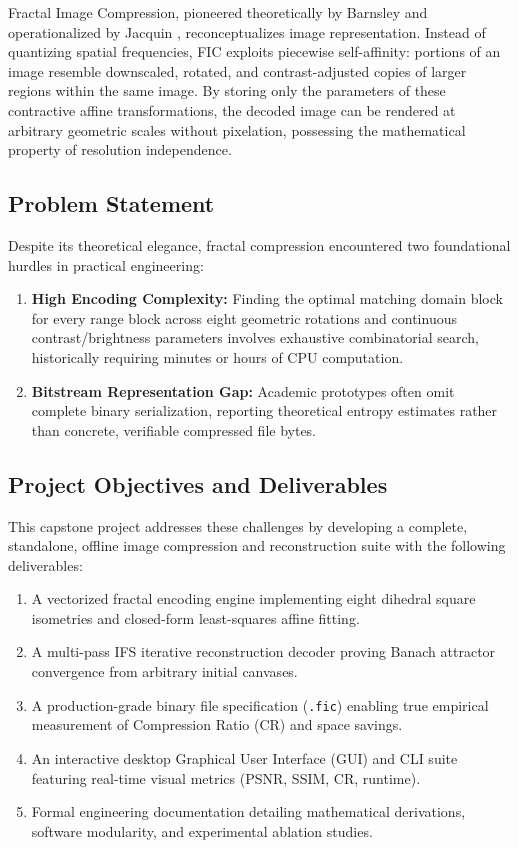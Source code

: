 \documentclass[11pt,a4paper]{article}
\begin{document}
Fractal Image Compression, pioneered theoretically by Barnsley \cite{barnsley1988fractals} and operationalized by Jacquin \cite{jacquin1992image}, reconceptualizes image representation. Instead of quantizing spatial frequencies, FIC exploits piecewise self-affinity: portions of an image resemble downscaled, rotated, and contrast-adjusted copies of larger regions within the same image. By storing only the parameters of these contractive affine transformations, the decoded image can be rendered at arbitrary geometric scales without pixelation, possessing the mathematical property of resolution independence.

\subsection{Problem Statement}
Despite its theoretical elegance, fractal compression encountered two foundational hurdles in practical engineering:
\begin{enumerate}
    \item \textbf{High Encoding Complexity:} Finding the optimal matching domain block for every range block across eight geometric rotations and continuous contrast/brightness parameters involves exhaustive combinatorial search, historically requiring minutes or hours of CPU computation.
    \item \textbf{Bitstream Representation Gap:} Academic prototypes often omit complete binary serialization, reporting theoretical entropy estimates rather than concrete, verifiable compressed file bytes.
\end{enumerate}

\subsection{Project Objectives and Deliverables}
This capstone project addresses these challenges by developing a complete, standalone, offline image compression and reconstruction suite with the following deliverables:
\begin{enumerate}
    \item A vectorized fractal encoding engine implementing eight dihedral square isometries and closed-form least-squares affine fitting.
    \item A multi-pass IFS iterative reconstruction decoder proving Banach attractor convergence from arbitrary initial canvases.
    \item A production-grade binary file specification (\texttt{.fic}) enabling true empirical measurement of Compression Ratio (CR) and space savings.
    \item An interactive desktop Graphical User Interface (GUI) and CLI suite featuring real-time visual metrics (PSNR, SSIM, CR, runtime).
    \item Formal engineering documentation detailing mathematical derivations, software modularity, and experimental ablation studies.
\end{enumerate}
\end{document}
